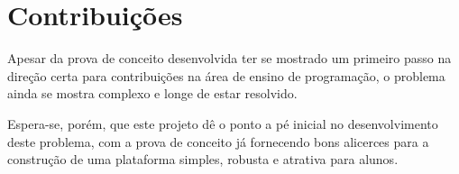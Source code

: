 \section{Contribuições}
Apesar da prova de conceito desenvolvida ter se mostrado um primeiro passo na direção certa 
para contribuições na área de ensino de programação, o problema ainda se mostra complexo 
e longe de estar resolvido.

Espera-se, porém, que este projeto dê o ponto a pé inicial no desenvolvimento deste problema, 
com a prova de conceito já fornecendo bons alicerces para a construção de uma plataforma simples, 
robusta e atrativa para alunos.

